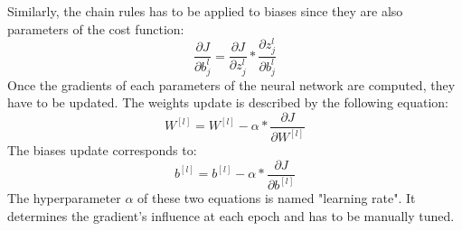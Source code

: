 Similarly, the chain rules has to be applied to biases since they are also parameters of the cost function:
\begin{equation}
\frac{\partial J}{\partial b_{j}^{l}} = \frac{\partial J}{\partial z_{j}^{l}} * \frac{\partial z_{j}^{l}}{\partial b_{j}^{l}}
\end{equation}
Once the gradients of each parameters of the neural network are computed, they have to be updated. The weights update is described by the following equation:
\begin{equation}
W^{[l]} = W^{[l]} - \alpha * \frac{\partial J}{\partial W^{[l]}}
\end{equation}
The biases update corresponds to:
\begin{equation}
b^{[l]} = b^{[l]} - \alpha * \frac{\partial J}{\partial b^{[l]}}
\end{equation}
The hyperparameter $\alpha$ of these two equations is named "learning rate". It determines the gradient's influence at each epoch and has to be manually tuned.

